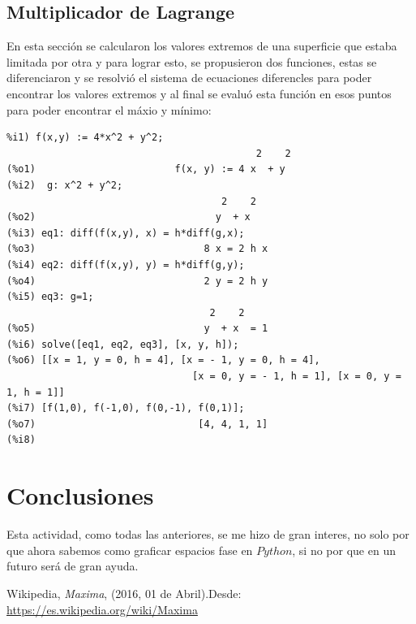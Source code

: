 \documentclass[12pt,letterpaper]{article}
\begin{document}
\subsection{Multiplicador de Lagrange}
En esta sección se calcularon los valores extremos de una superficie que estaba limitada por otra y para lograr esto, se propusieron dos funciones, estas se diferenciaron y se resolvió el sistema de ecuaciones diferencles para poder encontrar los valores extremos y al final se evaluó esta función en esos puntos para poder encontrar el máxio y mínimo:

\begin{verbatim}
%i1) f(x,y) := 4*x^2 + y^2;
                                           2    2
(%o1)                        f(x, y) := 4 x  + y
(%i2)  g: x^2 + y^2;
                                     2    2
(%o2)                               y  + x
(%i3) eq1: diff(f(x,y), x) = h*diff(g,x);
(%o3)                             8 x = 2 h x
(%i4) eq2: diff(f(x,y), y) = h*diff(g,y);
(%o4)                             2 y = 2 h y
(%i5) eq3: g=1;
                                   2    2
(%o5)                             y  + x  = 1
(%i6) solve([eq1, eq2, eq3], [x, y, h]);
(%o6) [[x = 1, y = 0, h = 4], [x = - 1, y = 0, h = 4], 
                                [x = 0, y = - 1, h = 1], [x = 0, y = 1, h = 1]]
(%i7) [f(1,0), f(-1,0), f(0,-1), f(0,1)];
(%o7)                            [4, 4, 1, 1]
(%i8) 
\end{verbatim}

\section*{Conclusiones}
Esta actividad, como todas las anteriores, se me hizo de gran interes, no solo por que ahora sabemos como graficar espacios fase en $Python$, si no por que en un futuro será de gran ayuda.

\begin{thebibliography}{widestlabel}
       Wikipedia, \emph{Maxima}, (2016, 01 de Abril).Desde: \url{https://es.wikipedia.org/wiki/Maxima}
\end{thebibliography}
\end{document}
